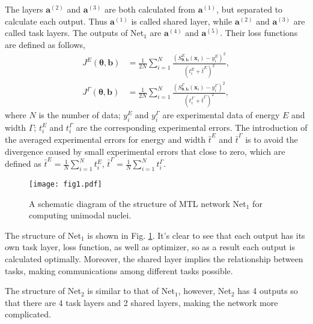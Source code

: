 \documentclass[twocolumn,showpacs,superscriptaddress,amsmath,amssymb,prc,preprintnumbers]{revtex4-1}
\begin{document}
The layers $\boldsymbol{a}^{(2)}$ and $\boldsymbol{a}^{(3)}$ are both calculated from $\boldsymbol{a}^{(1)}$, but separated to calculate each output. Thus  $\boldsymbol{a}^{(1)}$ is called  shared layer, while $\boldsymbol{a}^{(2)}$ and $\boldsymbol{a}^{(3)}$ are called task layers.
The outputs of Net$_1$ are $\boldsymbol{a}^{(4)}$ and $\boldsymbol{a}^{(5)}$.
Their loss functions are defined as follows,
\begin{align}
J^E(\boldsymbol{\theta},\boldsymbol{b}) &= \frac{1}{2N}\sum_{i=1}^N \frac{ (S^E_{\boldsymbol{\theta},\boldsymbol{b}}(\boldsymbol{x}_i)-y^E_{i})^2 }{(t^E_{i} + \bar{t}^E)^2}, \label{align:align11}
\\
J^{\Gamma}(\boldsymbol{\theta},\boldsymbol{b}) &= \frac{1}{2N}\sum_{i=1}^N \frac{ (S^{\Gamma}_{\boldsymbol{\theta},\boldsymbol{b}}(\boldsymbol{x}_i)-y^\Gamma _{i})^2 }{( t^\Gamma_{ i} + \bar{t}^\Gamma)^2}, \label{align:align12}
\end{align}
where $N$ is the number of data; $y^E_{i}$ and $y^\Gamma_{ i}$ are experimental data of energy $E$ and width $\Gamma$; $t^E_{i}$ and $t^\Gamma_{i}$ are the corresponding experimental errors.
The introduction of the averaged experimental errors for energy and width $\bar{t}^E$ and $\bar{t}^\Gamma$  is to avoid the divergence caused by small experimental errors that close to zero, which are defined as $\bar{t}^E = \frac{1}{N} \sum_{i=1}^{N}t^E_i $, $\bar{t}^\Gamma = \frac{1}{N} \sum_{i=1}^{N}t^\Gamma_i $.

\begin{figure}[htbp]\setlength{\abovecaptionskip}{0.0em}
\texttt{[image: fig1.pdf]}
\caption{A schematic diagram of the structure of MTL network Net$_1$ for computing unimodal nuclei.}\label{fig:fig1}
\end{figure}


The structure of Net$_1$ is shown in Fig. \ref{fig:fig1}.
It's clear to see that each output has its own task layer, loss function, as well as optimizer, so as a result each output is calculated optimally.
Moreover, the shared layer implies the relationship between tasks, making communications among different tasks possible.


The structure of Net$_2$ is similar to that of Net$_1$, however, Net$_2$ has 4 outputs so that there are 4 task layers and 2 shared layers, making the network more complicated.
\end{document}
